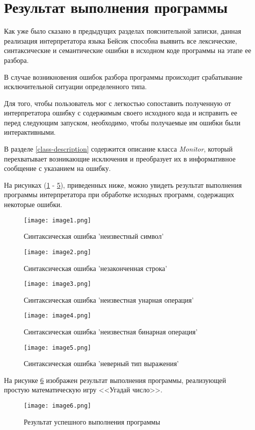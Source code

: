 \section{Результат выполнения программы}

Как уже было сказано в предыдущих разделах пояснительной записки,
данная реализация интерпретатора языка Бейсик способна выявить
все лексические, синтаксические и семантические ошибки в 
исходном коде программы на этапе ее разбора.

В случае возникновения ошибок разбора программы происходит
срабатывание исключительной ситуации определенного типа.

Для того, чтобы пользователь мог с легкостью сопоставить
полученную от интерпретатора ошибку с содержимым своего
исходного кода и исправить ее перед следующим запуском,
необходимо, чтобы получаемые им ошибки были интерактивными.

В разделе \ref{class-description} содержится описание класса \emph{Monitor}, 
который перехватывает возникающие исключения и 
преобразует их в информативное сообщение с указанием
на ошибку. 

На рисунках (\ref{error1} - \ref{error5}), приведенных ниже,
можно увидеть результат выполнения программы интерпретатора
при обработке исходных программ, содержащих некоторые
ошибки.

\begin{figure}[H]
    \centering
    \texttt{[image: image1.png]}
    \caption{Синтаксическая ошибка 'неизвестный символ'}
    \label{error1}
\end{figure}

\begin{figure}[H]
    \centering
    \texttt{[image: image2.png]}
    \caption{Синтаксическая ошибка 'незаконченная строка'}
    \label{error2}
\end{figure}

\begin{figure}[H]
    \centering
    \texttt{[image: image3.png]}
    \caption{Синтаксическая ошибка 'неизвестная унарная операция'}
    \label{error3}
\end{figure}

\begin{figure}[H]
    \centering
    \texttt{[image: image4.png]}
    \caption{Синтаксическая ошибка 'неизвестная бинарная операция'}
    \label{error4}
\end{figure}

\begin{figure}[H]
    \centering
    \texttt{[image: image5.png]}
    \caption{Синтаксическая ошибка 'неверный тип выражения'}
    \label{error5}
\end{figure}

\pagebreak

На рисунке \ref{guessing} изображен результат выполнения
программы, реализующей простую математическую игру <<Угадай число>>.

\begin{figure}[hb]
    \centering
    \texttt{[image: image6.png]}
    \caption{Результат успешного выполнения программы}
    \label{guessing}
\end{figure}
